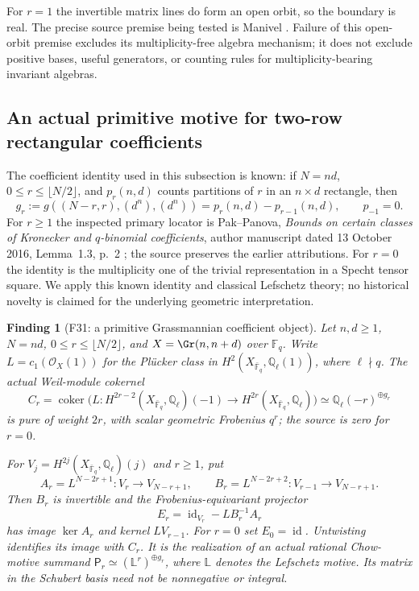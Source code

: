 \documentclass[11pt,a4paper]{article}
\newcommand{\Q}{\mathbb Q}\newcommand{\Z}{\mathbb Z}\newcommand{\C}{\mathbb C}\newcommand{\N}{\mathbb N}\newcommand{\F}{\mathbb F}
\newcommand{\id}{\operatorname{id}}\newcommand{\et}{\mathrm{\acute et}}\newcommand{\boxt}{\boxtimes}
\renewcommand{\S}{\ensuremath{\mathsection}}
\newcommand{\fid}[1]{\textsf{#1}}\newcommand{\gate}[1]{\textsf{#1}}
\theoremstyle{named}\newtheorem{finding}{Finding}[section]
\theoremstyle{definition}\newtheorem{definition}[finding]{Definition}
\theoremstyle{remark}\newtheorem{remark}[finding]{Remark}
\begin{document}
For $r=1$ the invertible matrix lines do form an open orbit, so the
boundary is real. The precise source premise being tested is Manivel
\cite[Lemma~1 and Corollary~1, \S3, p.~3]{Manivel}. Failure
of this open-orbit premise excludes its multiplicity-free algebra
mechanism; it does not exclude positive bases, useful generators,
or counting rules for multiplicity-bearing invariant algebras.

\subsection{An actual primitive motive for two-row rectangular coefficients}
The coefficient identity used in this subsection is known:
if $N=nd$, $0\le r\le\lfloor N/2\rfloor$, and $p_r(n,d)$ counts
partitions of $r$ in an $n\times d$ rectangle, then
\begin{equation}\label{eq:rectprimitiveknown}
 g_r:=g((N-r,r),(d^n),(d^n))=p_r(n,d)-p_{r-1}(n,d),
 \qquad p_{-1}=0.
\end{equation}
For $r\ge1$ the inspected primary locator is Pak--Panova,
\emph{Bounds on certain classes of Kronecker and $q$-binomial
coefficients}, author manuscript dated 13 October 2016,
Lemma~1.3, p.~2 \cite{PPBounds}; the source preserves the earlier
attributions. For $r=0$ the identity is the multiplicity one of the
trivial representation in a Specht tensor square. We apply this
known identity and classical Lefschetz theory; no historical
novelty is claimed for the underlying geometric interpretation.

\begin{finding}[\fid{F31}: a primitive Grassmannian coefficient object]\label{f:grassprimitive}
Let $n,d\ge1$, $N=nd$, $0\le r\le\lfloor N/2\rfloor$, and
$X=\Gr(n,n+d)$ over $\F_q$. Write $L=c_1(\mathcal O_X(1))$
for the Pl\"ucker class in $H^2(X_{\bar{\F}_q},\Q_\ell(1))$,
where $\ell\nmid q$. The actual Weil-module cokernel
\begin{equation}\label{eq:rectprimitivecoker}
 C_r=\operatorname{coker}\bigl(
 L:H^{2r-2}(X_{\bar{\F}_q},\Q_\ell)(-1)
       \longrightarrow H^{2r}(X_{\bar{\F}_q},\Q_\ell)\bigr)
 \simeq\Q_\ell(-r)^{\oplus g_r}
\end{equation}
is pure of weight $2r$, with scalar geometric Frobenius $q^r$;
the source is zero for $r=0$.

For $V_j=H^{2j}(X_{\bar{\F}_q},\Q_\ell)(j)$ and $r\ge1$, put
\[
 A_r=L^{N-2r+1}:V_r\longrightarrow V_{N-r+1},\qquad
 B_r=L^{N-2r+2}:V_{r-1}\longrightarrow V_{N-r+1}.
\]
Then $B_r$ is invertible and the Frobenius-equivariant projector
\begin{equation}\label{eq:rectprimitiveprojector}
 E_r=\id_{V_r}-L B_r^{-1}A_r
\end{equation}
has image $\ker A_r$ and kernel $L V_{r-1}$. For $r=0$ set
$E_0=\id$. Untwisting identifies its image with $C_r$.
It is the realization of an actual rational Chow-motive summand
$\mathsf P_r\simeq(\mathbb L^r)^{\oplus g_r}$, where
$\mathbb L$ denotes the Lefschetz motive. Its matrix in the
Schubert basis need not be nonnegative or integral.
\end{finding}
\end{document}
